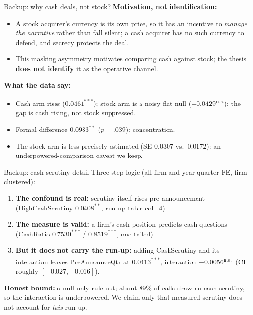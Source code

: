 \documentclass[aspectratio=169, 11pt]{beamer}
\newcommand{\ns}{\textsuperscript{n.s.}}
\begin{document}
\begin{frame}[noframenumbering]{Backup: why cash deals, not stock?}
  \textbf{Motivation, not identification:}
  \begin{itemize}
    \item A stock acquirer's currency is its own price, so it has an incentive
      to \emph{manage the narrative} rather than fall silent; a cash acquirer
      has no such currency to defend, and secrecy protects the deal.
    \item This masking asymmetry motivates comparing cash against stock;
      the thesis \textbf{does not identify} it as the operative channel.
  \end{itemize}
  \vspace{0.5em}
  \textbf{What the data say:}
  \begin{itemize}
    \item Cash arm rises ($0.0461^{***}$); stock arm is a noisy flat null
      ($-0.0429$\ns): \alert{the gap is cash rising, not stock suppressed}.
    \item Formal difference $0.0983^{**}$ ($p=.039$): concentration.
    \item The stock arm is less precisely estimated (SE $0.0307$ vs.\ $0.0172$):
      an underpowered-comparison caveat we keep.
  \end{itemize}
\end{frame}

\begin{frame}[noframenumbering]{Backup: cash-scrutiny detail}
  Three-step logic (all firm and year-quarter FE, firm-clustered):
  \begin{enumerate}
    \item \textbf{The confound is real:} scrutiny itself rises pre-announcement
      (HighCashScrutiny $0.0408^{**}$, run-up table col.\ 4).
    \item \textbf{The measure is valid:} a firm's cash position predicts cash
      questions (CashRatio $0.7530^{***}$ / $0.8519^{***}$, one-tailed).
    \item \textbf{But it does not carry the run-up:} adding CashScrutiny and
      its interaction leaves PreAnnounceQtr at $0.0413^{***}$;
      interaction $-0.0056$\ns\ (CI roughly $[-0.027, +0.016]$).
  \end{enumerate}
  \vspace{0.5em}
  \textbf{Honest bound:} a null-only rule-out; about 89\% of calls draw no cash
  scrutiny, so the interaction is underpowered. We claim only that measured
  scrutiny does not account for \emph{this} run-up.
\end{frame}
\end{document}
